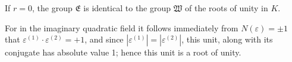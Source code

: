 If $r = 0$, the group $\mathfrak{E}$ is identical to the group $\mathfrak{W}$ of the roots of unity in $K$.

For in the imaginary quadratic field it follows immediately from $N(\varepsilon) = \pm 1$ that $\varepsilon^{(1)} \cdot \varepsilon^{(2)} = +1$, and since $|\varepsilon^{(1)}| = |\varepsilon^{(2)}|$, this unit, along with its conjugate has absolute value 1; hence this unit is a root of unity.
